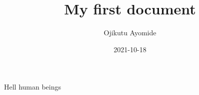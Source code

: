 \documentclass{article}
\title{My first document}
\date{2021-10-18}
\author{Ojikutu Ayomide}
\begin{document}
	\maketitle
	\newpage
	Hell human beings
\end{document}
